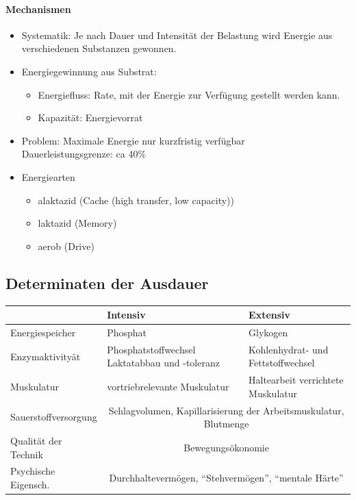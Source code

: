 \paragraph{Mechanismen}
\begin{itemize}
  \item Systematik: Je nach Dauer und Intensität der Belastung wird Energie aus verschiedenen Substanzen gewonnen.
  \item Energiegewinnung aus Substrat:
    \begin{itemize}
      \item Energiefluss: Rate, mit der Energie zur Verfügung gestellt werden kann.
      \item Kapazität: Energievorrat
    \end{itemize}
  \item Problem: Maximale Energie nur kurzfristig verfügbar\\
    Dauerleistungsgrenze: ca 40\%
  \item Energiearten
    \begin{itemize}
      \item alaktazid (Cache (high transfer, low capacity))
      \item laktazid (Memory)
      \item aerob (Drive)
    \end{itemize}
\end{itemize}

\subsection{Determinaten der Ausdauer}
\begin{centering}
\begin{tabular}{m{} | m{} | m{}}
                          & Intensiv                                                         & Extensiv \\ \hline
     Energiespeicher      & Phosphat                                                         & Glykogen \\ \hline
     Enzymaktivityät      & Phosphatstoffwechsel Laktatabbau und -toleranz                   & Kohlenhydrat- und Fettstoffwechsel \\ \hline
     Muskulatur           & vortriebrelevante Muskulatur                                     & Haltearbeit verrichtete Muskulatur \\ \hline
     Sauerstoffversorgung & \multicolumn{2}{c}{Schlagvolumen, Kapillarisierung der Arbeitsmuskulatur, Blutmenge} \\ \hline
     Qualität der Technik & \multicolumn{2}{c}{Bewegungsökonomie} \\ \hline
     Psychische Eigensch. & \multicolumn{2}{c}{Durchhaltevermögen, ``Stehvermögen'', ``mentale Härte''} \\
\end{tabular}
\end{centering}

